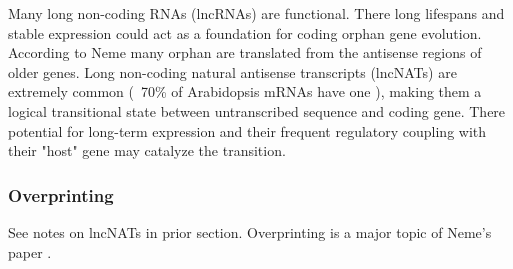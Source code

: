     Many long non-coding RNAs (lncRNAs) are functional. There long lifespans
    and stable expression could act as a foundation for coding orphan gene
    evolution. According to Neme \cite{neme_phylogenetic_2013} many orphan are
    translated from the antisense regions of older genes. Long non-coding
    natural antisense transcripts (lncNATs) are extremely common (~70\% of
    Arabidopsis mRNAs have one \cite{wang_genome-wide_2014}), making them a
    logical transitional state between untranscribed sequence and coding gene.
    There potential for long-term expression and their frequent regulatory
    coupling with their "host" gene may catalyze the transition.

\subsubsection{Overprinting}

    See notes on lncNATs in prior section. Overprinting is a major topic of
    Neme's paper \cite{neme_phylogenetic_2013}.
